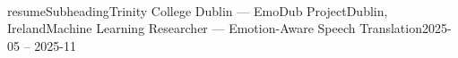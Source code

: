 \\resumeSubheading{Trinity College Dublin — EmoDub Project}{Dublin, Ireland}{Machine Learning Researcher — Emotion-Aware Speech Translation}{2025-05 -- 2025-11}
